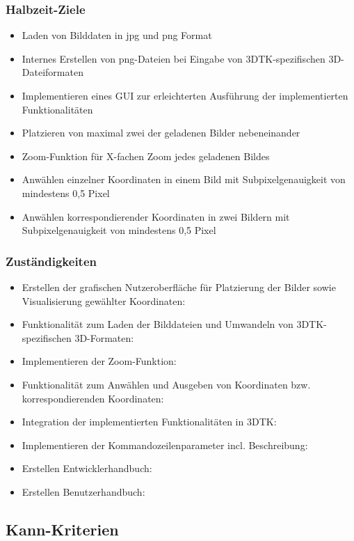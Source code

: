 \documentclass[a4paper,10pt]{scrartcl}
\begin{document}
\subsubsection{Halbzeit-Ziele}
\begin{itemize}
\item Laden von Bilddaten in jpg und png Format
\item Internes Erstellen von png-Dateien bei Eingabe von 3DTK-spezifischen 3D-Dateiformaten
\item Implementieren eines GUI zur erleichterten Ausführung der implementierten Funktionalitäten
\item Platzieren von maximal zwei der geladenen Bilder nebeneinander
\item Zoom-Funktion für X-fachen Zoom jedes geladenen Bildes
\item Anwählen einzelner Koordinaten in einem Bild mit Subpixelgenauigkeit von mindestens 0,5 Pixel
\item Anwählen korrespondierender Koordinaten in zwei Bildern mit Subpixelgenauigkeit von mindestens 0,5 Pixel
    
\end{itemize}
\newpage

\subsubsection{Zuständigkeiten}
\begin{itemize}
\item Erstellen der grafischen Nutzeroberfläche für Platzierung der Bilder sowie Visualisierung gewählter Koordinaten:
\item Funktionalität zum Laden der Bilddateien und Umwandeln von 3DTK-spezifischen 3D-Formaten: 
\item Implementieren der Zoom-Funktion: 
\item Funktionalität zum Anwählen und Ausgeben von Koordinaten bzw. korrespondierenden Koordinaten: 
\item Integration der implementierten Funktionalitäten in 3DTK: 
\item Implementieren der Kommandozeilenparameter incl. Beschreibung:
\item Erstellen Entwicklerhandbuch: 
\item Erstellen Benutzerhandbuch: 

\end{itemize}

\subsection{Kann-Kriterien}
\end{document}
